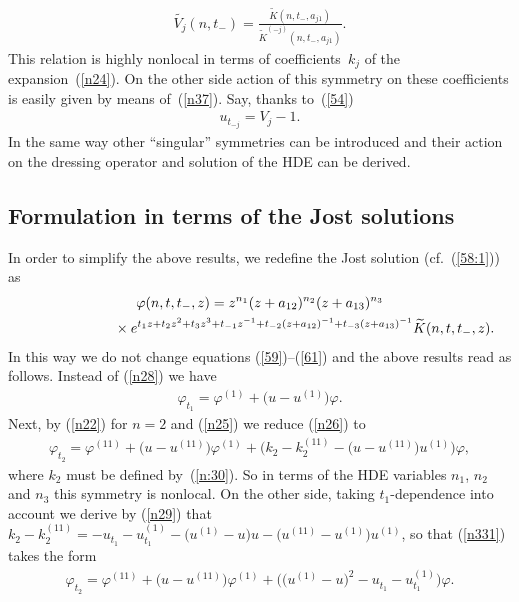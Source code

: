 \documentclass[pdftex]{sigma}
\numberwithin{equation}{section}
\begin{document}
\begin{gather}
\widetilde{V_{j}}(n,t_{-})=\frac{\widetilde{K}(n,t_{-},a_{j1})}{\widetilde{K}^{(-j)}_{}(n,t_{-},a_{j1})}.\label{n38}
\end{gather}
This relation is highly nonlocal in terms of coef\/f\/icients~$k_{j}$ of the expansion~(\ref{n24}). On the other side action of this symmetry on these coef\/f\/icients is easily given by means of~(\ref{n37}). Say, thanks to~(\ref{54})
\begin{gather}
u_{t_{-j}}=V_{j}-1.\label{n39}
\end{gather}
In the same way other ``singular'' symmetries can be introduced and their action on the dressing operator and solution of the HDE can be derived.

\subsection{Formulation in terms of the Jost solutions}
In order to simplify the above results, we redef\/ine the Jost solution (cf.~(\ref{58:1})) as
\begin{gather}
\varphi(n,t, t_{-},z)=z^{n_1}(z+a_{12})^{n_2}(z+a_{13})^{n_3} \nonumber\\
 \hphantom{\varphi(n,t, t_{-},z)=}{} \times e^{t_1z+t_2z^{2}+t_3z^{3}+t_{-1}z^{-1}+t_{-2}(z+a_ { 12 } )^ { -1 }+t_{-3}(z+a_{13})^{-1}} \widetilde{K}(n,t,t_{-},z).\label{n32}
\end{gather}
In this way we do not change equations (\ref{59})--(\ref{61}) and the above results read as follows. Instead of (\ref{n28}) we have
\begin{gather}
\varphi_{t_1}=\varphi^{(1)}+\big(u-u^{(1)}\big)\varphi.\label{n33}
\end{gather}
Next, by (\ref{n22}) for $n=2$ and (\ref{n25}) we reduce (\ref{n26}) to
\begin{gather}
 \varphi_{t_2}=\varphi^{(11)}+\big(u-u^{(11)}\big)\varphi^{(1)}+\big(k_{2}^{}-k_{2}^{(11)}-\big(u-u^{(11)}\big)u^{(1)}\big)\varphi,\label{n331}
\end{gather}
where $k_2$ must be def\/ined by~(\ref{n:30}). So in terms of the HDE variables $n_1$, $n_2$ and $n_3$ this symmetry is nonlocal. On the other side, taking $t_1$-dependence into account we derive by (\ref{n29}) that $k_2^{}-k_2^{(11)}=-u^{}_{t_1}-u^{(1)}_{t_1}-\big(u^{(1)}-u\big) u-\big(u^{(11)}-u^{(1)}\big)u^{(1)}$, so that (\ref{n331}) takes the form
\begin{gather}
\varphi_{t_2}=\varphi^{(11)}+\big(u-u^{(11)}\big)\varphi^{(1)}+\big(\big(u^{(1)}-u\big)^{2}-u^{}_{t_1}-u^{(1)}_{t_1}\big)\varphi.\label{n332}
\end{gather}
\end{document}
